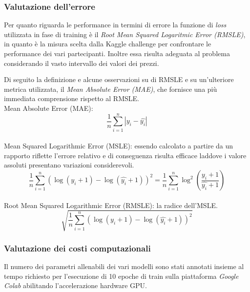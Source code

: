 \subsubsection{Valutazione dell'errore}

Per quanto riguarda le performance in termini di errore la funzione di
\textit{loss} utilizzata in fase di training è il \textit{Root Mean Squared
Logaritmic Error (RMSLE)}, in quanto è la misura scelta dalla Kaggle challenge
per confrontare le performance dei vari partecipanti. Inoltre essa risulta
adeguata al problema considerando il vasto intervallo dei valori dei prezzi.

Di seguito la definizione e alcune osservazioni su di RMSLE e su un'ulteriore
metrica utilizzata, il \textit{Mean Absolute Error (MAE)},
che fornisce una più immediata comprensione rispetto al RMSLE. \\
Mean Absolute Error (MAE):
\begin{equation}
    \frac{1}{n} \sum_{i=1}^{n} | y_i - \hat{y_i} |
\end{equation}
\\
Mean Squared Logarithmic Error (MSLE): essendo calcolato a partire da un
rapporto riflette l'errore relativo e di conseguenza risulta efficace laddove i
valore assoluti presentano variazioni considerevoli.
\begin{equation}
    \frac{1}{n}
        \sum_{i=1}^{n}
            ( \log(y_i+1) - \log(\hat{y_i}+1) )^2
    =
    \frac{1}{n}
        \sum_{i=1}^{n}
            \log^2(\frac{y_i+1}{\hat{y_i}+1})
\end{equation}
\\
Root Mean Squared Logarithmic Error (RMSLE): la radice dell'MSLE.
\begin{equation}
    \sqrt{ 
        \frac{1}{n}
            \sum_{i=1}^{n}
                ( \log(y_i+1) - \log(\hat{y_i}+1) )^2
    }
\end{equation}


\subsubsection{Valutazione dei costi computazionali}

Il numero dei parametri allenabili dei vari modelli sono stati annotati insieme
al tempo richiesto per l'esecuzione di 10 epoche di train sulla piattaforma
\textit{Google Colab} abilitando l'accelerazione hardware GPU.

